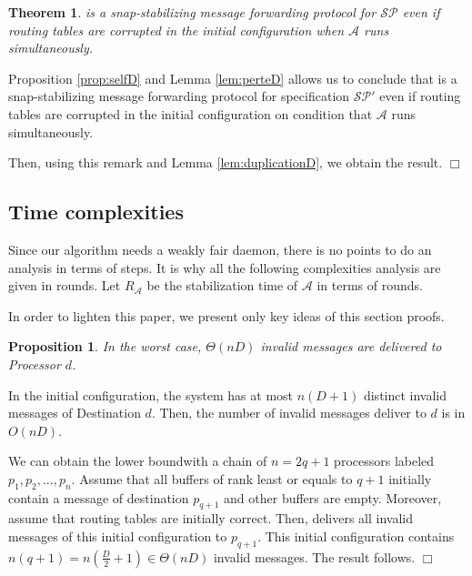 \documentclass[11pt]{article}
\newtheorem{theorem}{Theorem}
\newtheorem{proposition}{Proposition}
\newenvironment{proof}{{\noindent\bf Proof. } }{{\hfill $\Box$}}
\newenvironment{sketchproof}{{\noindent\bf Sketch of proof. } }{{\hfill $\Box$}}
\begin{document}
\begin{theorem} \label{th:snapD}
\AD is a snap-stabilizing message forwarding protocol for $\mathcal{SP}$ even if routing tables are corrupted in the initial configuration when $\mathcal{A}$ runs simultaneously.
\end{theorem}

\begin{proof}
Proposition \ref{prop:selfD} and Lemma \ref{lem:perteD} allows us to conclude that \AD is a snap-stabilizing message forwarding protocol for specification $\mathcal{SP}'$ even if routing tables are corrupted in the initial configuration on condition that $\mathcal{A}$ runs simultaneously.

Then, using this remark and Lemma \ref{lem:duplicationD}, we obtain the result.
\end{proof}

\subsection{Time complexities} \label{sub:analyseD}

Since our algorithm needs a weakly fair daemon, there is no points to do an analysis in terms of steps. It is why all the following complexities analysis are given in rounds. Let $R_{\mathcal{A}}$ be the stabilization time of $\mathcal{A}$ in terms of rounds.

In order to lighten this paper, we present only key ideas of this section proofs.

\begin{proposition} \label{prop:analysemesD}
In the worst case, $\Theta(nD)$ invalid messages are delivered to Processor $d$.
\end{proposition}

\begin{sketchproof}
In the initial configuration, the system has at most $n(D+1)$ distinct invalid messages of Destination $d$. Then, the number of invalid messages deliver to $d$ is in $O(nD)$. 

We can obtain the lower boundwith a chain of $n=2q+1$ processors labeled $p_{1},p_{2},...,p_{n}$. Assume that all buffers of rank least or equals to $q+1$ initially contain a message of destination $p_{q+1}$ and other buffers are empty. Moreover, assume that routing tables are initially correct. Then, \AD delivers all invalid messages of this initial configuration to $p_{q+1}$. This initial configuration contains $n(q+1)=n(\frac{D}{2}+1)\in\Theta(nD)$ invalid messages. The result follows.
\end{sketchproof}
\end{document}
